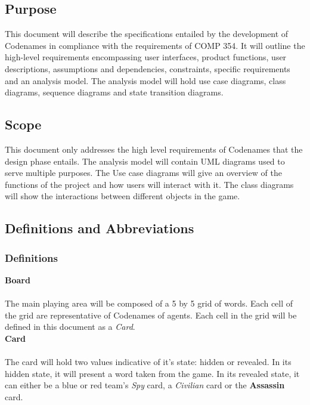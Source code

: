 \documentclass[10pt, a4paper]{article}
\begin{document}
	\subsection{Purpose}
	
	This document will describe the specifications entailed by the development of Codenames in compliance with the requirements of COMP 354. It will outline the high-level requirements encompassing user interfaces, product functions, user descriptions, assumptions and dependencies, constraints, specific requirements and an analysis model. The analysis model will hold use case diagrams, class diagrams, sequence diagrams and state transition diagrams.
	
	\subsection{Scope}
	
	This document only addresses the high level requirements of Codenames  that the design phase entails. The analysis model will contain UML diagrams used to serve multiple purposes. The Use case diagrams will give an overview of the functions of the project and how users will interact with it. The class diagrams will show the interactions between different objects in the game. \\
	
	
	\subsection{Definitions and Abbreviations}
	
	\subsubsection{Definitions}
	
	\textbf{Board} \\
	\\
	The main playing area will be composed of a 5 by 5 grid of words. Each cell of the grid are representative of Codenames of agents. Each cell in the grid will be defined in this document as a \textit{Card}.\\
	
	\textbf{Card} \\
	\\
	The card will hold two values indicative of it's state: hidden or revealed. In its hidden state, it will present a word taken from the game. In its revealed state, it can either be a blue or red team's \textit{Spy} card, a \textit{Civilian} card or the \textbf{Assassin} card.\\
	
\end{document}
